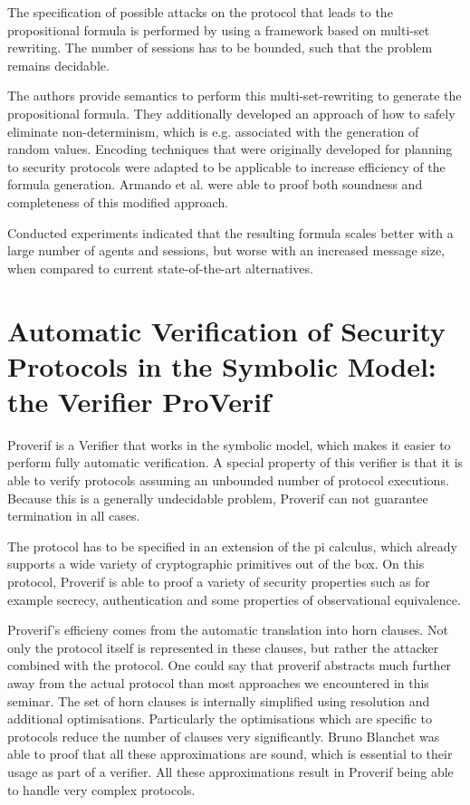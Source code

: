 \documentclass[a4paper,UKenglish]{lipics-v2018}
\begin{document}
The specification of possible attacks on the protocol that leads to the propositional formula is performed by using a framework based on multi-set rewriting. The number of sessions has to be bounded, such that the problem remains decidable.\cite{sat}


The authors provide semantics to perform this multi-set-rewriting to generate the propositional formula. They additionally developed an approach of how to safely eliminate non-determinism, which is e.g. associated with the generation of random values.
Encoding techniques that were originally developed for planning to security protocols were adapted to be applicable to increase efficiency of the formula generation. Armando et al. were able to proof both soundness and completeness of this modified approach.\cite{sat}

Conducted experiments indicated that the resulting formula scales better with a large number of agents and sessions, but worse with an increased message size, when compared to current state-of-the-art alternatives.\cite{sat}





\newpage
\section{Automatic Verification of Security Protocols in the Symbolic Model: the Verifier ProVerif}

Proverif is a Verifier that works in the symbolic model, which makes it easier to perform fully automatic verification. A special property of this verifier is that it is able to verify protocols assuming an unbounded number of protocol executions. Because this is a generally undecidable problem, Proverif can not guarantee termination in all cases.\cite{ProVerif}

The protocol has to be specified in an extension of the pi calculus, which already supports a wide variety of cryptographic primitives out of the box. On this protocol, Proverif is able to proof a variety of security properties such as for example secrecy, authentication and some properties of observational equivalence.\cite{ProVerif}

Proverif's efficieny comes from the automatic translation into horn clauses. Not only the protocol itself is represented in these clauses, but rather the attacker combined with the protocol. One could say that proverif abstracts much further away from the actual protocol than most approaches we encountered in this seminar. The set of horn clauses is internally simplified using resolution and additional optimisations. Particularly the optimisations which are specific to protocols reduce the number of clauses very significantly. Bruno Blanchet was able to proof that all these approximations are sound, which is essential to their usage as part of a verifier. All these approximations result in Proverif being able to handle very complex protocols.\cite{ProVerif}
\end{document}
